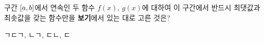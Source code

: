 구간 $[a{,}\mkern3mu\mathopen{}b]$에서 연속인 두 함수 $f(x)$, $g(x)$에 대하여 이 구간에서 반드시 최댓값과 최솟값을 갖는 함수만을 \textbf{보기}에서 있는 대로 고른 것은? 
\begin{choices32}{ㄱ}{ㄷ}{ㄱ, ㄴ}{ㄱ, ㄷ}{ㄴ, ㄷ}\end{choices32}
